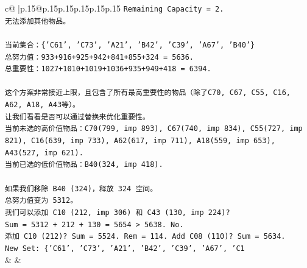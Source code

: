 \documentclass{article}
\begin{document}
{\begin{supertabular}{c@{$\;$}|p{.15\linewidth}@{}p{.15\linewidth}p{.15\linewidth}p{.15\linewidth}p{.15\linewidth}p{.15\linewidth}}
{{{\texttt{Remaining Capacity = 2.} \\
\texttt{无法添加其他物品。} \\
\\ 
\texttt{当前集合：\{'C61', 'C73', 'A21', 'B42', 'C39', 'A67', 'B40'\}} \\
\texttt{总努力值：933+916+925+942+841+855+324 = 5636.} \\
\texttt{总重要性：1027+1010+1019+1036+935+949+418 = 6394.} \\
\\ 
\texttt{这个方案非常接近上限，且包含了所有最高重要性的物品（除了C70, C67, C55, C16, A62, A18, A43等）。} \\
\texttt{让我们看看是否可以通过替换来优化重要性。} \\
\texttt{当前未选的高价值物品：C70(799, imp 893), C67(740, imp 834), C55(727, imp 821), C16(639, imp 733), A62(617, imp 711), A18(559, imp 653), A43(527, imp 621).} \\
\texttt{当前已选的低价值物品：B40(324, imp 418).} \\
\\ 
\texttt{如果我们移除 B40 (324)，释放 324 空间。} \\
\texttt{总努力值变为 5312。} \\
\texttt{我们可以添加 C10 (212, imp 306) 和 C43 (130, imp 224)?} \\
\texttt{Sum = 5312 + 212 + 130 = 5654 > 5638. No.} \\
\texttt{添加 C10 (212)? Sum = 5524. Rem = 114. Add C08 (110)? Sum = 5634.} \\
\texttt{New Set: \{'C61', 'C73', 'A21', 'B42', 'C39', 'A67', 'C1} \\
            }
        }
    }
    & & \\ \\


\end{supertabular}}
\end{document}
